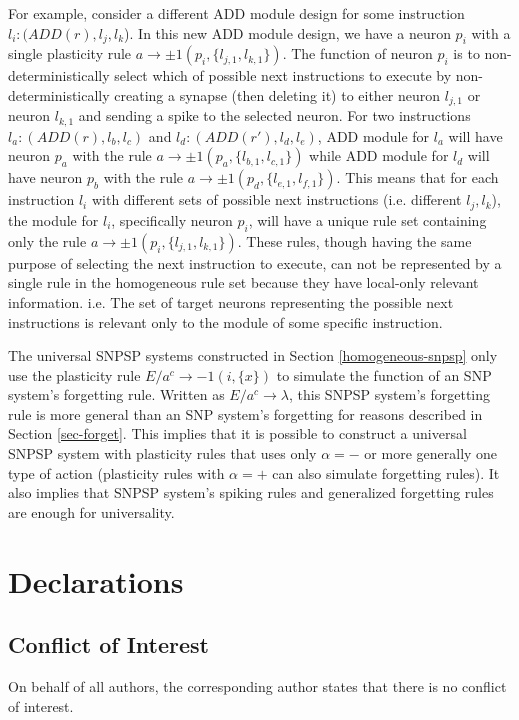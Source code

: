 \documentclass[smallextended]{svjour3}
\begin{document}
For example, consider a different ADD module design for some instruction $l_i: (ADD(r), l_j, l_k$). In this new ADD module design, we have a neuron 
$p_i$ with a single plasticity rule $a \rightarrow \pm1(p_i, \{l_{j,1}, l_{k,1}\})$. The function of neuron $p_i$ is to non-deterministically select 
which of possible next instructions to execute by non-deterministically creating a synapse (then deleting it) to either neuron $l_{j,1}$ or 
neuron $l_{k,1}$ and sending a spike to the selected neuron. For two instructions $l_a: (ADD(r), l_b,l_c)$ and $l_d:(ADD(r'), l_d, l_e)$, ADD module
for $l_a$ will have neuron $p_a$ with the rule $a \rightarrow \pm1(p_a,\{l_{b,1}, l_{c,1}\})$ while ADD module for $l_d$ will have neuron $p_b$ with
the rule $a \rightarrow \pm1(p_d,\{l_{e,1}, l_{f,1}\})$. This means that for each instruction $l_i$ with different sets of possible next instructions 
(i.e. different $l_j, l_k$), the module for $l_i$, specifically neuron $p_i$, will have a unique rule set containing only  the rule $a \rightarrow \pm1(p_i,
\{l_{j,1}, l_{k,1}\})$. These rules, though having the same purpose of selecting the next instruction to execute, can not be represented by a single
rule in the homogeneous rule set because they have local-only relevant information. i.e. The set of target neurons representing the possible next
instructions is relevant only to the module of some specific instruction.

The universal SNPSP systems constructed in Section \ref{homogeneous-snpsp} only use the plasticity rule $E/a^c \rightarrow -1(i,\{x\})$ to simulate
the function of an SNP system's forgetting rule. Written as $E/a^c \rightarrow \lambda$, this SNPSP system's forgetting rule is more general than
an SNP system's forgetting for reasons described in Section \ref{sec-forget}. This implies that it is possible to construct a universal SNPSP system
with plasticity rules that uses only $\alpha = -$ or more generally one type of action (plasticity rules with $\alpha = +$ can also simulate 
forgetting rules). It also implies that SNPSP system's spiking rules and  generalized forgetting rules are enough for universality.


\section*{Declarations}

\subsection*{Conflict of Interest}
On behalf of all authors, the corresponding author states that there is no conflict of interest.
\end{document}
